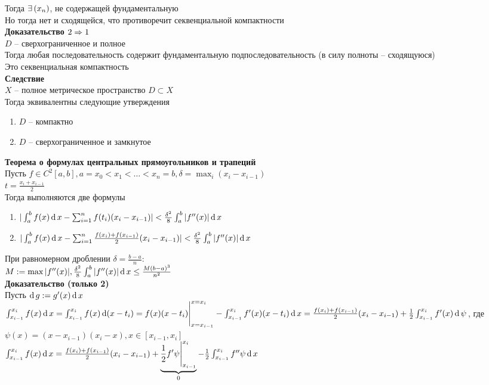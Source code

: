 \documentclass[12pt]{article}
\begin{document}
Тогда $\ex (x_n)$, не содержащей фундаментальную\\
Но тогда нет и сходящейся, что противоречит секвенциальной компактности\\
\textbf{Доказательство $2 \Rto 1$}\\
$D$ -- сверхограниченное и полное\\
Тогда любая последовательность содержит фундаментальную подпоследовательность (в силу полноты -- сходящуюся)\\
Это секвенциальная компактность\\
\textbf{Следствие}\\
$X$ -- полное метрическое пространство $D \subset X$\\
Тогда эквивалентны следующие утверждения
\begin{enumerate}
    \item $D$ -- компактно
    \item $D$ -- сверхограниченное и замкнутое
\end{enumerate}
\textbf{Теорема о формулах центральных прямоугольников и трапеций}\\
Пусть $f \in C^2[a,b], a=x_0 < x_1 < \ldots < x_n = b, \delta = \max_i (x_i - x_{i-1})$\\
$t = \frac{x_i + x_{i-1}}2$\\
Тогда выполняются две формулы
\begin{enumerate}
    \item $| \int_a^b f(x)\df x - \sum_{i=1}^n f(t_i)(x_i-x_{i-1})| < \frac{\delta^2}8 \int_a^b |f''(x)|\df x$
    \item $| \int_a^b f(x)\df x - \sum_{i=1}^n \frac{f(x_i) + f(x_{i-1})}2 (x_i - x_{i-1})| < \frac{\delta^2}8 \int_a^b |f''(x)| \df x$
\end{enumerate}
При равномерном дроблении $\delta = \frac{b-a}n:$\\
$M:= \max |f''(x)|, \frac{\delta^2}8 \int_a^b |f''(x)| \df x \leq \frac{M(b-a)^3}{n^2}$\\
\textbf{Доказательство (только 2)}\\
Пусть $\df g:= g'(x) \df x$\\
$\int_{x_{i-1}}^{x_i} f(x)\df x = \int_{x_{i-1}}^{x_i} f(x) \df (x-t_i) = f(x)(x-t_i)\vl_{x=x_{i-1}}^{x=x_i} - \int_{x_{i-1}}^{x_i} f'(x)(x-t_i)\df x = \frac{f(x_i)+f(x_{i-1})}2(x_i-x_{i-1}) + \frac12\int_{x_{i-1}}^{x_i} f'(x)\df \psi$, где $\psi(x) = (x-x_{i-1})(x_i-x), x \in [x_{i-1}, x_i]$\\
$\int_{x_{i-1}}^{x_i} f(x)\df x = \frac{f(x_i)+f(x_{i-1})}2(x_i-x_{i-1}) + \ub{0}{\frac12 f'\psi\vl_{x_{i-1}}^{x_i}} - \frac12 \int_{x_{i-1}}^{x_i} f''\psi \df x$\\
\end{document}
